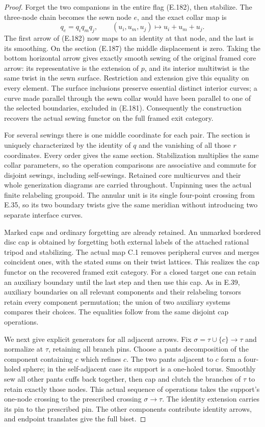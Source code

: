 \begin{proof}
Forget the two companions in the entire flag (E.182), then
stabilize.  The three-node chain becomes the sewn node $e$,
and the exact collar map is
\[
       q_e=q_iq_mq_j,
       \qquad (u_i,u_m,u_j)\longmapsto u_i+u_m+u_j.           \tag{E.188}
\]
The first arrow of (E.182) now maps to an identity at that
node, and the last is its smoothing.  On the section (E.187)
the middle displacement is zero.  Taking the bottom horizontal
arrow gives exactly smooth sewing of the original framed core
arrow: its representative is the extension of $p$, and its
interior multitwist is the same twist in the sewn surface.
Restriction and extension give this equality on every element.
The surface inclusions preserve essential distinct interior
curves; a curve made parallel through the sewn collar would
have been parallel to one of the selected boundaries, excluded
in (E.181).  Consequently the construction recovers the
actual sewing functor on the full framed exit category.

For several sewings there is one middle coordinate for each
pair.  The section is uniquely characterized by the identity
of $q$ and the vanishing of all those $r$ coordinates.
Every order gives the same section.  Stabilization multiplies
the same collar parameters, so the operation comparisons
are associative and commute for disjoint sewings, including
self-sewings.  Retained core multicurves and their whole
generization diagrams are carried throughout.  Unpinning
uses the actual finite relabeling groupoid.  The annular
unit is its single four-point crossing from E.35, so its two
boundary twists give the same meridian without introducing
two separate interface curves.

Marked caps and ordinary forgetting are already retained.
An unmarked bordered disc cap is obtained by forgetting both
external labels of the attached rational tripod and stabilizing.
The actual map C.1 removes peripheral curves and merges
coincident ones, with the stated sums on their twist lattices.
This realizes the cap functor on the recovered framed exit
category.  For a closed target one can retain an auxiliary
boundary until the last step and then use this cap.  As in
E.39, auxiliary boundaries on all relevant components and
their relabeling torsors retain every component permutation;
the union of two auxiliary systems compares their choices.
The equalities follow from the same disjoint cap operations.

We next give explicit generators for all adjacent arrows.
Fix $\sigma=\tau\cup\{c\}\to\tau$ and normalize at $\tau$,
retaining all branch pins.  Choose a pants decomposition of
the component containing $c$ which refines $c$.  The two
pants adjacent to $c$ form a four-holed sphere; in the
self-adjacent case its support is a one-holed torus.
Smoothly sew all other pants cuffs back together, then cap
and clutch the branches of $\tau$ to retain exactly those
nodes.  This actual sequence of operations takes the
support's one-node crossing to the prescribed crossing
$\sigma\to\tau$.  The identity extension carries its
pin to the prescribed pin.  The other components contribute
identity arrows, and endpoint translates give the full biset.


\end{proof}
